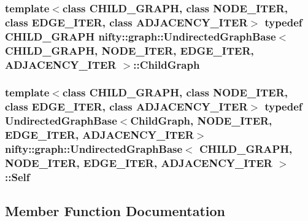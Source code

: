 \subsubsection[{Child\+Graph}]{\setlength{\rightskip}{0pt plus 5cm}template$<$class C\+H\+I\+L\+D\+\_\+\+G\+R\+A\+P\+H, class N\+O\+D\+E\+\_\+\+I\+T\+E\+R, class E\+D\+G\+E\+\_\+\+I\+T\+E\+R, class A\+D\+J\+A\+C\+E\+N\+C\+Y\+\_\+\+I\+T\+E\+R$>$ typedef C\+H\+I\+L\+D\+\_\+\+G\+R\+A\+P\+H {\bf nifty\+::graph\+::\+Undirected\+Graph\+Base}$<$ C\+H\+I\+L\+D\+\_\+\+G\+R\+A\+P\+H, N\+O\+D\+E\+\_\+\+I\+T\+E\+R, E\+D\+G\+E\+\_\+\+I\+T\+E\+R, A\+D\+J\+A\+C\+E\+N\+C\+Y\+\_\+\+I\+T\+E\+R $>$\+::{\bf Child\+Graph}}\label{classnifty_1_1graph_1_1UndirectedGraphBase_af2541cf9fb91440ff0a7b56dd5a6be29}
\hypertarget{classnifty_1_1graph_1_1UndirectedGraphBase_a3a637f240a8d05794be99e5f290a71b9}{}
\subsubsection[{Self}]{\setlength{\rightskip}{0pt plus 5cm}template$<$class C\+H\+I\+L\+D\+\_\+\+G\+R\+A\+P\+H, class N\+O\+D\+E\+\_\+\+I\+T\+E\+R, class E\+D\+G\+E\+\_\+\+I\+T\+E\+R, class A\+D\+J\+A\+C\+E\+N\+C\+Y\+\_\+\+I\+T\+E\+R$>$ typedef {\bf Undirected\+Graph\+Base}$<${\bf Child\+Graph}, N\+O\+D\+E\+\_\+\+I\+T\+E\+R, E\+D\+G\+E\+\_\+\+I\+T\+E\+R, A\+D\+J\+A\+C\+E\+N\+C\+Y\+\_\+\+I\+T\+E\+R$>$ {\bf nifty\+::graph\+::\+Undirected\+Graph\+Base}$<$ C\+H\+I\+L\+D\+\_\+\+G\+R\+A\+P\+H, N\+O\+D\+E\+\_\+\+I\+T\+E\+R, E\+D\+G\+E\+\_\+\+I\+T\+E\+R, A\+D\+J\+A\+C\+E\+N\+C\+Y\+\_\+\+I\+T\+E\+R $>$\+::{\bf Self}}\label{classnifty_1_1graph_1_1UndirectedGraphBase_a3a637f240a8d05794be99e5f290a71b9}


\subsection{Member Function Documentation}
\hypertarget{classnifty_1_1graph_1_1UndirectedGraphBase_a7077e010ade064cd0e5f7bbca55120b7}{}
